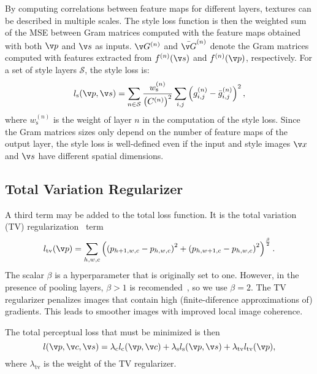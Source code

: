 By computing correlations between feature maps for different layers, textures can be described in multiple scales. The style loss function is then the weighted sum of the MSE between Gram matrices computed with the feature maps obtained with both $\v p$ and $\v s$ as inputs. $\v G^{(n)}$ and $\bar{\v G}^{(n)}$ denote the Gram matrices computed with features extracted from $f^{(n)}(\v s)$ and  $f^{(n)}(\v p)$, respectively. For a set of style layers $\mathcal{S}$, the style loss is:
\begin{equation}
l_\text{s}(\v p, \v s) = \sum_{n\in \mathcal{S}}\frac{w_\text{s}^{(n)}}{\left(C^{(n)}\right)^2}\sum_{i, j}\left(g^{(n)}_{i,j} - \bar{g}^{(n)}_{i,j}\right)^2,
\end{equation}
where $w^{(n)}_\text{s}$ is the weight of layer $n$ in the computation of the style loss. Since the Gram matrices sizes only depend on the number of feature maps of the output layer, the style loss is well-defined even if the input and style images $\v x$ and $\v s$ have different spatial dimensions.

\subsection{Total Variation Regularizer}
A third term may be added to the total loss function. It is the total variation (TV) regularization~\cite{mahendran2015understanding} term
\begin{equation}
l_\text{tv}(\v p) = \sum_{h,w,c}\left(\left(p_{h+1,w,c} - p_{h,w,c}\right)^2 + \left(p_{h,w+1,c} - p_{h,w,c}\right)^2\right)^{\frac{\beta}{2}}.
\end{equation}
The scalar $\beta$ is a hyperparameter that is originally set to one. However, in the presence of pooling layers, $\beta > 1$ is recomended~\cite{mahendran2015understanding}, so we use $\beta = 2$. The TV regularizer penalizes images that contain high (finite-diference approximations of) gradients. This leads to smoother images with improved local image coherence.

The total perceptual loss that must be minimized is then
\begin{equation}
l(\v p, \v c, \v s) = \lambda_\text{c} l_\text{c}(\v p, \v c) + \lambda_\text{s} l_\text{s}(\v p, \v s) + \lambda_\text{tv}l_\text{tv}(\v p),
\end{equation}
where $\lambda_\text{tv}$ is the weight of the TV regularizer.
